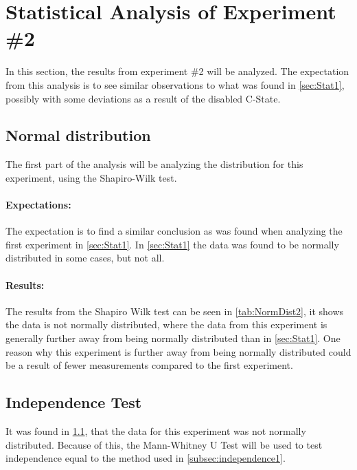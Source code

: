 \section{Statistical Analysis of Experiment \#2}\label{sec:Stat2}
In this section, the results from experiment \#2 will be analyzed. The expectation from this analysis is to see similar observations to what was found in \cref{sec:Stat1}, possibly with some deviations as a result of the disabled C-State. 

\subsection{Normal distribution}\label{subsec:NormalDist2}

The first part of the analysis will be analyzing the distribution for this experiment, using the Shapiro-Wilk test\cite{razali2011power}.

\paragraph{Expectations:} The expectation is to find a similar conclusion as was found when analyzing the first experiment in \cref{sec:Stat1}. In \cref{sec:Stat1} the data was found to be normally distributed in some cases, but not all.

 


\paragraph{Results:} The results from the Shapiro Wilk test can be seen in \cref{tab:NormDist2}, it shows the data is not normally distributed, where the data from this experiment is generally further away from being normally distributed than in \cref{sec:Stat1}. One reason why this experiment is further away from being normally distributed could be a result of fewer measurements compared to the first experiment.

\subsection{Independence Test}\label{subsec:independence2}
It was found in \cref{subsec:NormalDist2}, that the data for this experiment was not normally distributed. Because of this, the Mann-Whitney U Test\cite{mann1947test} will be used to test independence equal to the method used in \cref{subsec:independence1}.

